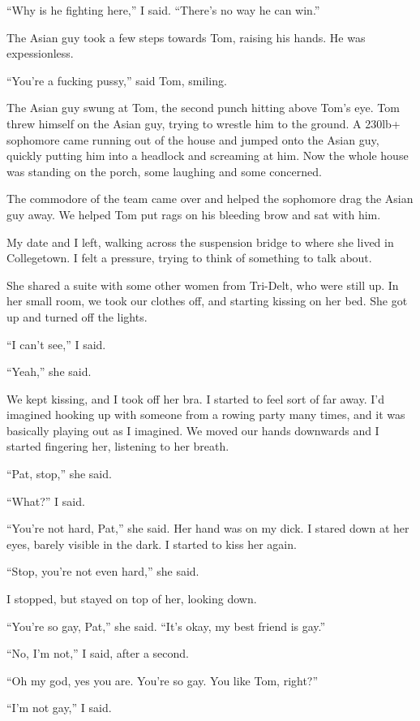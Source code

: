 ``Why is he fighting here,'' I said.  ``There's no way he can win.'' 

The Asian guy took a few steps towards Tom, raising his hands.  He was
expessionless.

``You're a fucking pussy,'' said Tom, smiling. 

The Asian guy swung at Tom, the second punch hitting above Tom's eye.  Tom threw
himself on the Asian guy, trying to wrestle him to the ground.  A 230lb+
sophomore came running out of the house and jumped onto the Asian guy, quickly
putting him into a headlock and screaming at him.   Now the whole house was
standing on the porch, some laughing and some concerned.

The commodore of the team came over and helped the sophomore drag the Asian guy
away.  We helped Tom put rags on his bleeding brow and sat with him.

My date and I left, walking across the suspension bridge to where she
lived in Collegetown.  I felt a pressure, trying to think of something to talk
about.

She shared a suite with some other women from Tri-Delt, who were still up.  In
her small room, we took our clothes off, and starting kissing on her bed.  She
got up and turned off the lights.

``I can't see,'' I said.  

``Yeah,'' she said.

We kept kissing, and I took off her bra.  I started to feel sort of far away.
I'd imagined hooking up with someone from a rowing party many times, and it was
basically playing out as I imagined.  We moved our hands downwards and I started
fingering her, listening to her breath.

``Pat, stop,'' she said.

``What?'' I said.

``You're not hard, Pat,'' she said.  Her hand was on my dick.  I stared down at
her eyes, barely visible in the dark.  I started to kiss her again.

``Stop, you're not even hard,'' she said.

I stopped, but stayed on top of her, looking down.

``You're so gay, Pat,'' she said.  ``It's okay, my best friend is gay.''

``No, I'm not,'' I said, after a second.

``Oh my god, yes you are.  You're so gay.  You like Tom, right?''

``I'm not gay,'' I said.

